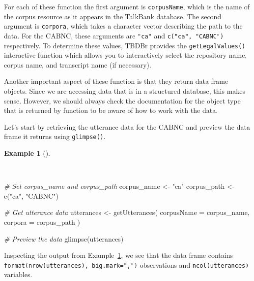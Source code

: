 \documentclass[
  letterpaper,
]{latex/krantz}
\newenvironment{Shaded}{\begin{snugshade}}{\end{snugshade}}
\newcommand{\AttributeTok}[1]{\textcolor[rgb]{0.00,0.00,0.00}{#1}}
\newcommand{\CommentTok}[1]{\textcolor[rgb]{0.00,0.00,0.00}{\textit{#1}}}
\newcommand{\FunctionTok}[1]{\textcolor[rgb]{0.00,0.00,0.00}{#1}}
\newcommand{\NormalTok}[1]{\textcolor[rgb]{0.00,0.00,0.00}{#1}}
\newcommand{\OtherTok}[1]{\textcolor[rgb]{0.00,0.00,0.00}{#1}}
\newcommand{\StringTok}[1]{\textcolor[rgb]{0.00,0.00,0.00}{#1}}
\theoremstyle{definition}
\newtheorem{example}{Example}[chapter]
\theoremstyle{remark}
\begin{document}
For each of these function the first argument is \texttt{corpusName},
which is the name of the corpus resource as it appears in the TalkBank
database. The second argument is \texttt{corpora}, which takes a
character vector describing the path to the data. For the CABNC, these
arguments are \texttt{"ca"} and \texttt{c("ca",\ "CABNC")} respectively.
To determine these values, TBDBr provides the \texttt{getLegalValues()}
interactive function which allows you to interactively select the
repository name, corpus name, and transcript name (if necessary).

Another important aspect of these function is that they return data
frame objects. Since we are accessing data that is in a structured
database, this makes sense. However, we should always check the
documentation for the object type that is returned by function to be
aware of how to work with the data.

Let's start by retrieving the utterance data for the CABNC and preview
the data frame it returns using \texttt{glimpse()}.

\begin{example}[]\protect\hypertarget{exm-ad-get-utterances}{}\label{exm-ad-get-utterances}

~

\begin{Shaded}
\begin{Highlighting}[]
\CommentTok{\# Set corpus\_name and corpus\_path}
\NormalTok{corpus\_name }\OtherTok{\textless{}{-}} \StringTok{"ca"}
\NormalTok{corpus\_path }\OtherTok{\textless{}{-}} \FunctionTok{c}\NormalTok{(}\StringTok{"ca"}\NormalTok{, }\StringTok{"CABNC"}\NormalTok{)}

\CommentTok{\# Get utterance data}
\NormalTok{utterances }\OtherTok{\textless{}{-}}
  \FunctionTok{getUtterances}\NormalTok{(}
    \AttributeTok{corpusName =}\NormalTok{ corpus\_name,}
    \AttributeTok{corpora =}\NormalTok{ corpus\_path}
\NormalTok{    )}

\CommentTok{\# Preview the data}
\FunctionTok{glimpse}\NormalTok{(utterances)}
\end{Highlighting}
\end{Shaded}

\end{example}

Inspecting the output from Example~\ref{exm-ad-get-utterances}, we see
that the data frame contains
\texttt{format(nrow(utterances),\ big.mark=",")} observations and
\texttt{ncol(utterances)} variables.
\end{document}
